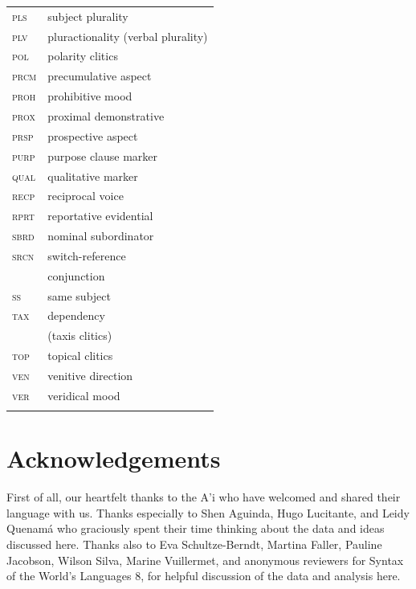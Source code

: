 \documentclass[output=paper,colorlinks,citecolor=brown]{langscibook}
\begin{document}
\begin{tabularx}{.45\textwidth}{lQ@{}}
\textsc{pls}     & subject plurality \\
\textsc{plv}     & pluractionality    (verbal plurality) \\
\textsc{pol}     & polarity clitics  \\
\textsc{prcm}    & precumulative aspect \\
\textsc{proh}    & prohibitive mood \\
\textsc{prox}    & proximal demonstrative \\
\textsc{prsp}    & prospective aspect \\
\textsc{purp}    & purpose clause marker  \\
\textsc{qual}    & qualitative marker \\
\textsc{recp}    & reciprocal voice \\
\textsc{rprt}    & reportative evidential \\
\textsc{sbrd}    & nominal subordinator \\
\textsc{srcn}    & switch-reference \\
            & conjunction \\
\textsc{ss}      & same subject \\
\textsc{tax}     & dependency \\
            & (taxis clitics) \\ 
\textsc{top}     & topical clitics \\
\textsc{ven}     & venitive direction \\
\textsc{ver}     & veridical mood \\
\\
\end{tabularx}




\section*{Acknowledgements}

First of all, our heartfelt thanks to the A'i who have welcomed and shared their language with us. Thanks especially to Shen Aguinda, Hugo Lucitante, and Leidy Quenamá who graciously spent their time thinking about the data and ideas discussed here. Thanks also to Eva Schultze-Berndt, Martina Faller, Pauline Jacobson, Wilson Silva, Marine Vuillermet, and anonymous reviewers for Syntax of the World's Languages 8, for helpful discussion of the data and analysis here.
\end{document}

